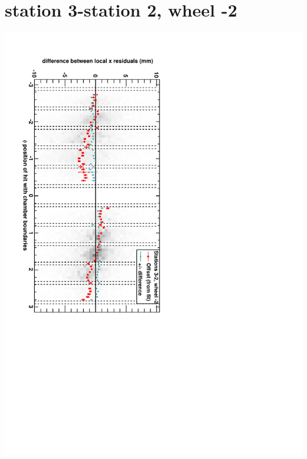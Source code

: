 \documentclass[compress]{beamer}
\begin{document}
\section*{station 3-station 2, wheel -2}
\begin{frame} \vfill \mbox{\hspace{-1 cm}\includegraphics[height=1.2\linewidth, angle=90]{DTrphidiff23VsPhi_whA_slope.pdf}} \end{frame}
\end{document}
